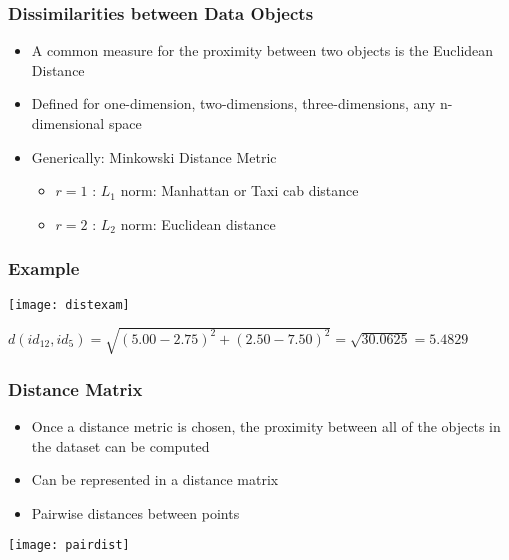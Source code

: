 \begin{frame}[fragile]\frametitle{Dissimilarities between Data Objects}
\begin{itemize}
\item A common measure for the proximity between two objects is the Euclidean Distance
\item Defined for one-dimension, two-dimensions, three-dimensions, any n-dimensional space
\item Generically: Minkowski Distance Metric
	\begin{itemize}
	\item $r=1$ : $L_1$ norm: Manhattan or Taxi cab distance
	\item $r=2$ : $L_2$ norm: Euclidean distance
	\end{itemize}
%
\end{itemize}
\end{frame}

\begin{frame}[fragile]\frametitle{Example}
\begin{center}
\texttt{[image: distexam]}
\end{center}
$d(id_{12},id_5) = \sqrt{(5.00 - 2.75)^2 + (2.50 - 7.50)^2} = \sqrt{30.0625} = 5.4829$
\end{frame}

\begin{frame}[fragile]\frametitle{Distance Matrix}
\begin{itemize}
\item Once a distance metric is chosen, the proximity between all of the objects in the dataset can be computed
\item Can be represented in a distance matrix
\item Pairwise distances between points
\end{itemize}
\begin{center}
\texttt{[image: pairdist]}
\end{center}
\end{frame}

